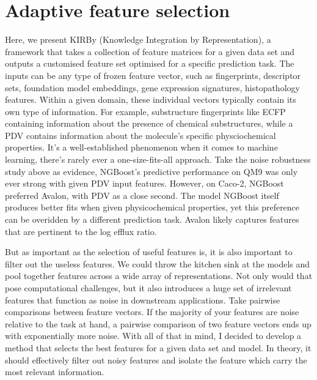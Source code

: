 \section{Adaptive feature selection}

Here, we present KIRBy (Knowledge Integration by Representation), a framework that takes a collection of feature matrices for a given data set and outputs a customised feature set optimised for a specific prediction task. The inputs can be any type of frozen feature vector, such as fingerprints, descriptor sets, foundation model embeddings, gene expression signatures, histopathology features. Within a given domain, these individual vectors typically contain its own type of information. For example, substructure fingerprints like ECFP containing information about the presence of chemical substructures, while a PDV contains information about the molecule's specific physciochemical properties. It's a well-established phenomenon when it comes to machine learning, there's rarely ever a one-size-fits-all approach. Take the noise robustness study above as evidence, NGBoost's predictive performance on QM9 was only ever strong with given PDV input features. However, on Caco-2, NGBoost preferred Avalon, with PDV as a close second. The model NGBoost itself produces better fits when given physicochemical properties, yet this preference can be overidden by a different prediction task. Avalon likely captures features that are pertinent to the log efflux ratio. 

But as important as the selection of useful features is, it is also important to filter out the useless features. We could throw the kitchen sink at the models and pool together features across a wide array of representations. Not only would that pose computational challenges, but it also introduces a huge set of irrelevant features that function as noise in downstream applications. Take pairwise comparisons between feature vectors. If the majority of your features are noise relative to the task at hand, a pairwise comparison of two feature vectors ends up with exponentially more noise. With all of that in mind, I decided to develop a method that selects the best features for a given data set and model. In theory, it should effectively filter out noisy features and isolate the feature which carry the most relevant information. 

